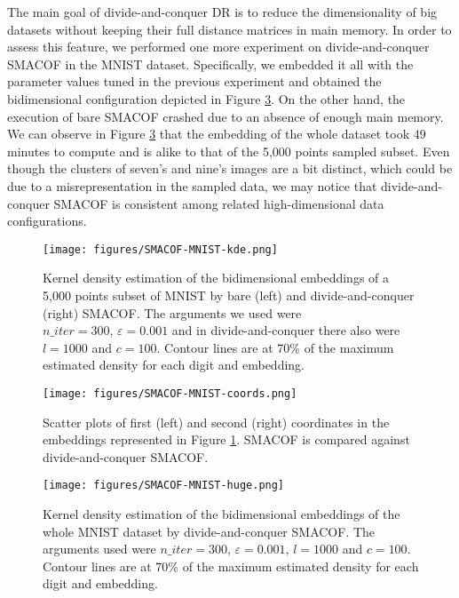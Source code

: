 The main goal of divide-and-conquer DR is to reduce the dimensionality of big datasets without keeping their full distance matrices in main memory. In order to assess this feature, we performed one more experiment on divide-and-conquer SMACOF in the MNIST dataset. Specifically, we embedded it all with the parameter values tuned in the previous experiment and obtained the bidimensional configuration depicted in Figure \ref{fig:SMACOF-MNIST-huge}. On the other hand, the execution of bare SMACOF crashed due to an absence of enough main memory. We can observe in Figure \ref{fig:SMACOF-MNIST-huge} that the embedding of the whole dataset took 49 minutes to compute and is alike to that of the 5,000 points sampled subset. Even though the clusters of seven's and nine's images are a bit distinct, which could be due to a misrepresentation in the sampled data, we may notice that divide-and-conquer SMACOF is consistent among related high-dimensional data configurations.

\begin{figure}
    \centering
    \texttt{[image: figures/SMACOF-MNIST-kde.png]}
    \caption{Kernel density estimation of the bidimensional embeddings of a 5,000 points subset of MNIST by bare (left) and divide-and-conquer (right) SMACOF. The arguments we used were $n\_iter = 300,\, \varepsilon = 0.001$ and in divide-and-conquer there also were $l=1000$ and $c=100$. Contour lines are at 70\% of the maximum estimated density for each digit and embedding.}
    \label{fig:SMACOF-MNIST-kde}
\end{figure}

\begin{figure}
    \centering
    \texttt{[image: figures/SMACOF-MNIST-coords.png]}
    \caption{Scatter plots of first (left) and second (right) coordinates in the embeddings represented in Figure \ref{fig:SMACOF-MNIST-kde}. SMACOF is compared against divide-and-conquer SMACOF.}
    \label{fig:SMACOF-MNIST-coords}
\end{figure}

\begin{figure}
    \centering
    \texttt{[image: figures/SMACOF-MNIST-huge.png]}
    \caption{Kernel density estimation of the bidimensional embeddings of the whole MNIST dataset by divide-and-conquer SMACOF. The arguments used were $n\_iter = 300,\, \varepsilon = 0.001, \, l=1000$ and $c=100$. Contour lines are at 70\% of the maximum estimated density for each digit and embedding.}
    \label{fig:SMACOF-MNIST-huge}
\end{figure}

